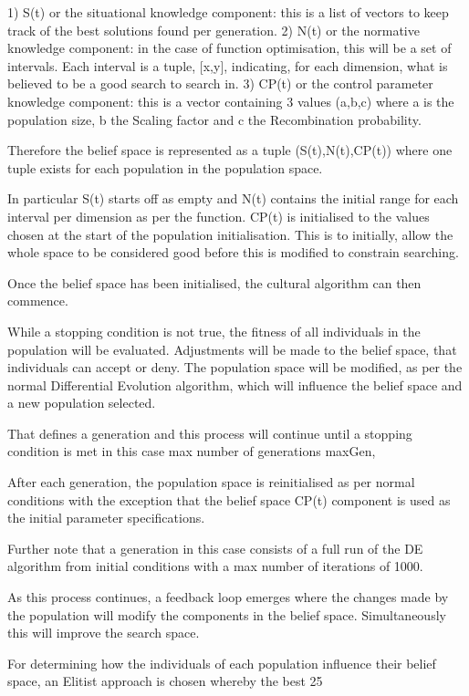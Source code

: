 \documentclass[12pt]{article}
\begin{document}
	1) S(t) or the situational knowledge component: this is a list of vectors to keep track of the best solutions found per generation.
	2) N(t) or the normative knowledge component: in the case of function optimisation, this will be a set of intervals. Each interval is a tuple, {[x,y]}, indicating, for each dimension, what is believed to be a good search to search in.
	3) CP(t) or the control parameter knowledge component: this is a vector containing 3 values (a,b,c) where a is the population size, b the Scaling factor and c the Recombination probability.

Therefore the belief space is represented as a tuple (S(t),N(t),CP(t)) where one tuple exists for each population in the population space.

In particular S(t) starts off as empty and N(t) contains the initial range  for each interval per dimension as per the function. CP(t) is initialised to the values chosen at the start of the population initialisation. This is to initially, allow the whole space to be considered good before this is modified to constrain searching.

Once the belief space has been initialised, the cultural algorithm can then commence.

While a stopping condition is not true, the fitness of all individuals in the population will be evaluated. Adjustments will be made to the belief space, that individuals can accept or deny. The population space will be modified, as per the normal Differential Evolution algorithm, which will influence the belief space and a new population selected. 

That defines a generation and this process will continue until a stopping condition is met in this case max number of generations maxGen,

After each generation, the population space is reinitialised as per normal conditions with the exception that the belief space CP(t) component is used as the initial parameter specifications.

Further note that a generation in this case consists of a full run of the DE algorithm from initial conditions with a max number of iterations of 1000.

As this process continues, a feedback loop emerges where the changes made by the population will modify the components in the belief space. Simultaneously this will improve the search space.

For determining how the individuals of each population influence their belief space, an Elitist approach is chosen whereby the best 25%
\end{document}
